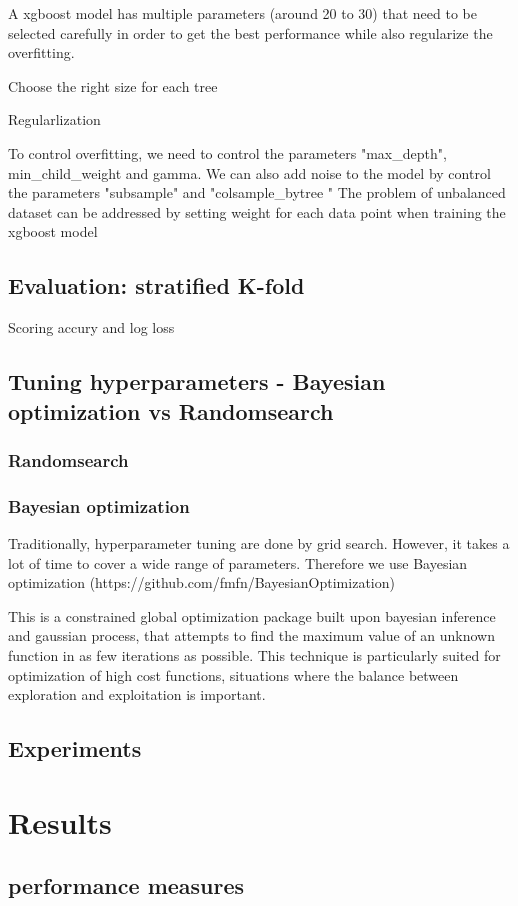 \documentclass[journal,twocolumn,letterpaper]{IEEEJERM}
\begin{document}
A xgboost model has multiple parameters (around 20 to 30) that need to be selected carefully in order to get the best performance while also regularize the overfitting.  

Choose the right size for each tree

Regularlization

To control overfitting, we need to control the parameters "max\_depth", min\_child\_weight and gamma. We can also add noise to the model by control the parameters "subsample" and "colsample\_bytree
"
The problem of unbalanced dataset can be addressed by setting weight for each data point when training the xgboost model
\subsection{ Evaluation: stratified K-fold}
 Scoring accury and log loss
\subsection{Tuning hyperparameters - Bayesian optimization vs Randomsearch}
\subsubsection{Randomsearch}
\subsubsection{Bayesian optimization}


Traditionally, hyperparameter tuning are done by grid search. However, it takes a lot of time to cover a wide range of parameters. Therefore we use Bayesian optimization (https://github.com/fmfn/BayesianOptimization)  

This is a constrained global optimization package built upon bayesian inference and gaussian process, that attempts to find the maximum value of an unknown function in as few iterations as possible. This technique is particularly suited for optimization of high cost functions, situations where the balance between exploration and exploitation is important.  
\subsection{Experiments}


\section{Results}
\subsection{performance measures}
\end{document}
